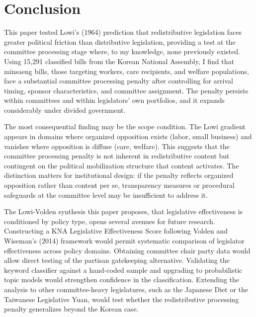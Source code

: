\documentclass[11pt]{article}
\begin{document}
\section{Conclusion}

This paper tested Lowi's (1964) prediction that redistributive legislation faces greater political friction than distributive legislation, providing a test at the committee processing stage where, to my knowledge, none previously existed. Using 15,291 classified bills from the Korean National Assembly, I find that minsaeng bills, those targeting workers, care recipients, and welfare populations, face a substantial committee processing penalty after controlling for arrival timing, sponsor characteristics, and committee assignment. The penalty persists within committees and within legislators' own portfolios, and it expands considerably under divided government.

The most consequential finding may be the scope condition. The Lowi gradient appears in domains where organized opposition exists (labor, small business) and vanishes where opposition is diffuse (care, welfare). This suggests that the committee processing penalty is not inherent in redistributive content but contingent on the political mobilization structure that content activates. The distinction matters for institutional design: if the penalty reflects organized opposition rather than content per se, transparency measures or procedural safeguards at the committee level may be insufficient to address it.

The Lowi-Volden synthesis this paper proposes, that legislative effectiveness is conditioned by policy type, opens several avenues for future research. Constructing a KNA Legislative Effectiveness Score following Volden and Wiseman's (2014) framework would permit systematic comparison of legislator effectiveness across policy domains. Obtaining committee chair party data would allow direct testing of the partisan gatekeeping alternative. Validating the keyword classifier against a hand-coded sample and upgrading to probabilistic topic models would strengthen confidence in the classification. Extending the analysis to other committee-heavy legislatures, such as the Japanese Diet or the Taiwanese Legislative Yuan, would test whether the redistributive processing penalty generalizes beyond the Korean case.
\end{document}

